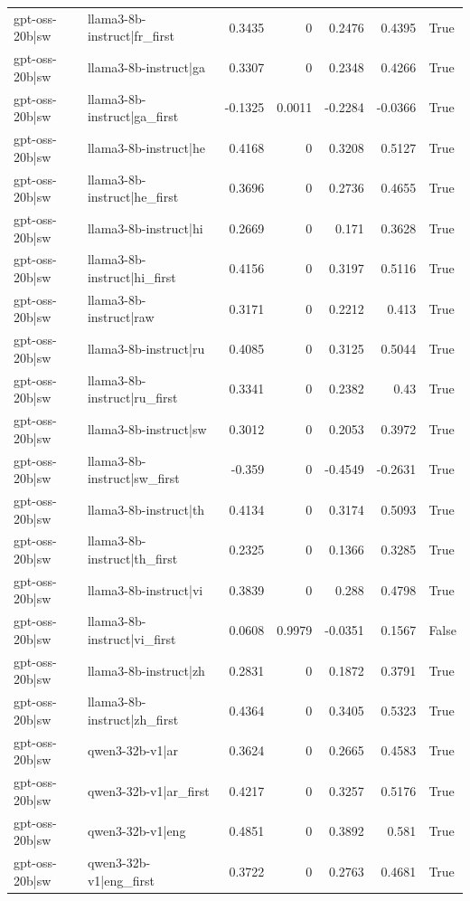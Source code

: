 \begin{table}
\begin{tabular}{l l r r r r l}
gpt-oss-20b|sw & llama3-8b-instruct|fr_first & 0.3435 & 0 & 0.2476 & 0.4395 & True \\
gpt-oss-20b|sw & llama3-8b-instruct|ga & 0.3307 & 0 & 0.2348 & 0.4266 & True \\
gpt-oss-20b|sw & llama3-8b-instruct|ga_first & -0.1325 & 0.0011 & -0.2284 & -0.0366 & True \\
gpt-oss-20b|sw & llama3-8b-instruct|he & 0.4168 & 0 & 0.3208 & 0.5127 & True \\
gpt-oss-20b|sw & llama3-8b-instruct|he_first & 0.3696 & 0 & 0.2736 & 0.4655 & True \\
gpt-oss-20b|sw & llama3-8b-instruct|hi & 0.2669 & 0 & 0.171 & 0.3628 & True \\
gpt-oss-20b|sw & llama3-8b-instruct|hi_first & 0.4156 & 0 & 0.3197 & 0.5116 & True \\
gpt-oss-20b|sw & llama3-8b-instruct|raw & 0.3171 & 0 & 0.2212 & 0.413 & True \\
gpt-oss-20b|sw & llama3-8b-instruct|ru & 0.4085 & 0 & 0.3125 & 0.5044 & True \\
gpt-oss-20b|sw & llama3-8b-instruct|ru_first & 0.3341 & 0 & 0.2382 & 0.43 & True \\
gpt-oss-20b|sw & llama3-8b-instruct|sw & 0.3012 & 0 & 0.2053 & 0.3972 & True \\
gpt-oss-20b|sw & llama3-8b-instruct|sw_first & -0.359 & 0 & -0.4549 & -0.2631 & True \\
gpt-oss-20b|sw & llama3-8b-instruct|th & 0.4134 & 0 & 0.3174 & 0.5093 & True \\
gpt-oss-20b|sw & llama3-8b-instruct|th_first & 0.2325 & 0 & 0.1366 & 0.3285 & True \\
gpt-oss-20b|sw & llama3-8b-instruct|vi & 0.3839 & 0 & 0.288 & 0.4798 & True \\
gpt-oss-20b|sw & llama3-8b-instruct|vi_first & 0.0608 & 0.9979 & -0.0351 & 0.1567 & False \\
gpt-oss-20b|sw & llama3-8b-instruct|zh & 0.2831 & 0 & 0.1872 & 0.3791 & True \\
gpt-oss-20b|sw & llama3-8b-instruct|zh_first & 0.4364 & 0 & 0.3405 & 0.5323 & True \\
gpt-oss-20b|sw & qwen3-32b-v1|ar & 0.3624 & 0 & 0.2665 & 0.4583 & True \\
gpt-oss-20b|sw & qwen3-32b-v1|ar_first & 0.4217 & 0 & 0.3257 & 0.5176 & True \\
gpt-oss-20b|sw & qwen3-32b-v1|eng & 0.4851 & 0 & 0.3892 & 0.581 & True \\
gpt-oss-20b|sw & qwen3-32b-v1|eng_first & 0.3722 & 0 & 0.2763 & 0.4681 & True \\

\end{tabular}
\end{table}
